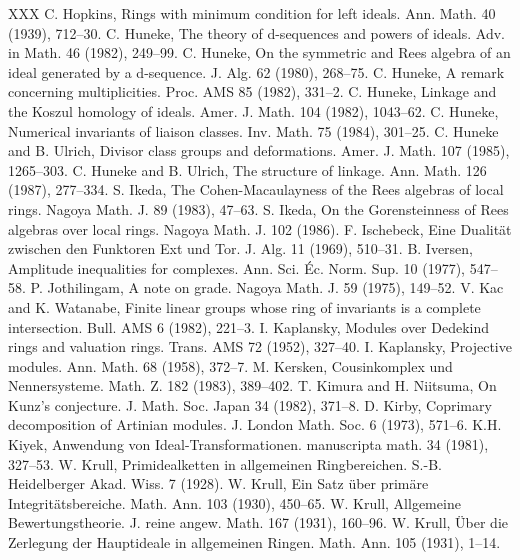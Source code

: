 \begin{thebibliography}{XXX}
 C. Hopkins, Rings with minimum condition for left ideals. Ann. Math. 40 (1939), 712--30.
 C. Huneke, The theory of d-sequences and powers of ideals. Adv. in Math. 46 (1982), 249--99.
 C. Huneke, On the symmetric and Rees algebra of an ideal generated by a d-sequence. J. Alg. 62 (1980), 268--75.
 C. Huneke, A remark concerning multiplicities. Proc. AMS 85 (1982), 331--2.
 C. Huneke, Linkage and the Koszul homology of ideals. Amer. J. Math. 104 (1982), 1043--62.
 C. Huneke, Numerical invariants of liaison classes. Inv. Math. 75 (1984), 301--25.
 C. Huneke and B. Ulrich, Divisor class groups and deformations. Amer. J. Math. 107 (1985), 1265--303.
 C. Huneke and B. Ulrich, The structure of linkage. Ann. Math. 126 (1987), 277--334.
 S. Ikeda, The Cohen-Macaulayness of the Rees algebras of local rings. Nagoya Math. J. 89 (1983), 47--63.
 S. Ikeda, On the Gorensteinness of Rees algebras over local rings. Nagoya Math. J. 102 (1986).
 F. Ischebeck, Eine Dualit\"at zwischen den Funktoren Ext und Tor. J. Alg. 11 (1969), 510--31.
 B. Iversen, Amplitude inequalities for complexes. Ann. Sci. \'Ec. Norm. Sup. 10 (1977), 547--58.
 P. Jothilingam, A note on grade. Nagoya Math. J. 59 (1975), 149--52.
 V. Kac and K. Watanabe, Finite linear groups whose ring of invariants is a complete intersection. Bull. AMS 6 (1982), 221--3.
 I. Kaplansky, Modules over Dedekind rings and valuation rings. Trans. AMS 72 (1952), 327--40.
 I. Kaplansky, Projective modules. Ann. Math. 68 (1958), 372--7.
 M. Kersken, Cousinkomplex und Nennersysteme. Math. Z. 182 (1983), 389--402.
 T. Kimura and H. Niitsuma, On Kunz's conjecture. J. Math. Soc. Japan 34 (1982), 371--8.
 D. Kirby, Coprimary decomposition of Artinian modules. J. London Math. Soc. 6 (1973), 571--6.
 K.H. Kiyek, Anwendung von Ideal-Transformationen. manuscripta math. 34 (1981), 327--53.
 W. Krull, Primidealketten in allgemeinen Ringbereichen. S.-B. Heidelberger Akad. Wiss. 7 (1928).
 W. Krull, Ein Satz \"uber prim\"are Integrit\"atsbereiche. Math. Ann. 103 (1930), 450--65.
 W. Krull, Allgemeine Bewertungstheorie. J. reine angew. Math. 167 (1931), 160--96.
 W. Krull, \"Uber die Zerlegung der Hauptideale in allgemeinen Ringen. Math. Ann. 105 (1931), 1--14.

\end{thebibliography}
